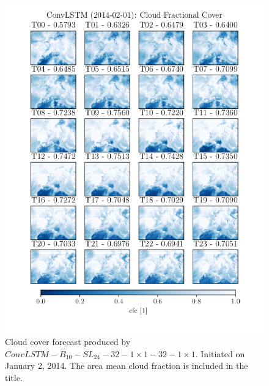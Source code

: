 \begin{figure}[ht]
    \centering
    \includegraphics{python_figs/timelapse_convlstm_1x1_24hrs_from_2014-02-01.png}
    \caption{Cloud cover forecast produced by $ConvLSTM-B_{10}-SL_{24}-32-1\times1-32-1\times1$. Initiated on January 2, 2014. The area mean cloud fraction is included in the title.}
    \label{fig:timelapse_1x1}
\end{figure}
\cleardoublepage

